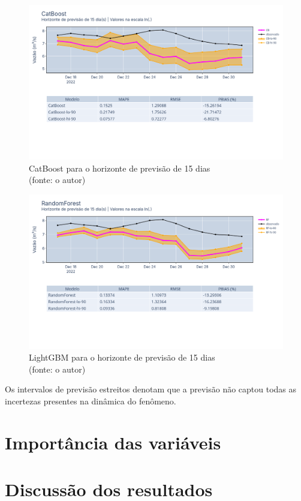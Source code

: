 \begin{figure}[!h]
	\centering
	\includegraphics[scale=0.33]{Figuras/jequiti/resultados/CatBoost_fh15.png}
	\caption{CatBoost para o horizonte de previsão de 15 dias\\(fonte: o autor)}
	\label{fig:jequiti_CatBoostRegressor_fh15}
\end{figure}

\begin{figure}[!h]
	\centering
	\includegraphics[scale=0.33]{Figuras/jequiti/resultados/RandomForest_fh15.png}
	\caption{LightGBM para o horizonte de previsão de 15 dias\\(fonte: o autor)}
	\label{fig:jequiti_LGBMRegressor_fh15}
\end{figure}
\clearpage

Os intervalos de previsão estreitos denotam que a previsão não captou todas as incertezas presentes na dinâmica do fenômeno.\cite{RobHyndman_prediction_intervals}

\section{Importância das variáveis}

\section{Discuss\~ao dos resultados}
